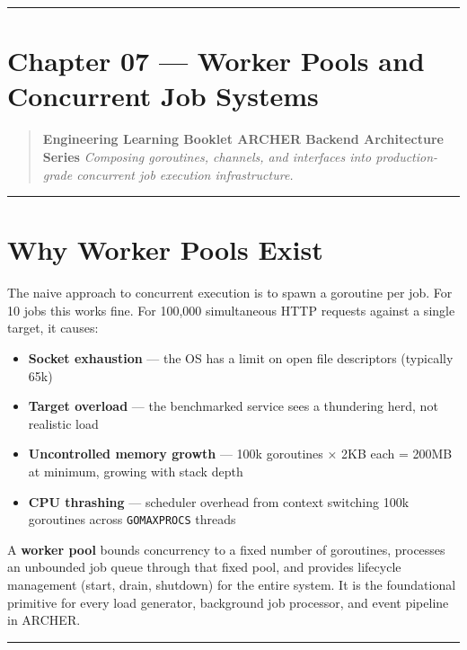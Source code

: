 \documentclass[11pt,a4paper,oneside]{book}
\providecommand{\tightlist}{\setlength{\itemsep}{0pt}\setlength{\parskip}{0pt}}
\begin{document}
\begin{center}\rule{0.5\linewidth}{0.5pt}\end{center}

\section{Chapter 07 --- Worker Pools and Concurrent Job
Systems}

\begin{quote}
\textbf{Engineering Learning Booklet \textbar{} ARCHER Backend
Architecture Series} \emph{Composing goroutines, channels, and
interfaces into production-grade concurrent job execution
infrastructure.}
\end{quote}

\begin{center}\rule{0.5\linewidth}{0.5pt}\end{center}

\section{Why Worker Pools Exist}

The naive approach to concurrent execution is to spawn a goroutine per
job. For 10 jobs this works fine. For 100,000 simultaneous HTTP requests
against a single target, it causes:

\begin{itemize}
\tightlist
\item
  \textbf{Socket exhaustion} --- the OS has a limit on open file
  descriptors (typically 65k)
\item
  \textbf{Target overload} --- the benchmarked service sees a thundering
  herd, not realistic load
\item
  \textbf{Uncontrolled memory growth} --- 100k goroutines × 2KB each =
  200MB at minimum, growing with stack depth
\item
  \textbf{CPU thrashing} --- scheduler overhead from context switching
  100k goroutines across \texttt{GOMAXPROCS} threads
\end{itemize}

A \textbf{worker pool} bounds concurrency to a fixed number of
goroutines, processes an unbounded job queue through that fixed pool,
and provides lifecycle management (start, drain, shutdown) for the
entire system. It is the foundational primitive for every load
generator, background job processor, and event pipeline in ARCHER.

\begin{center}\rule{0.5\linewidth}{0.5pt}\end{center}
\end{document}
